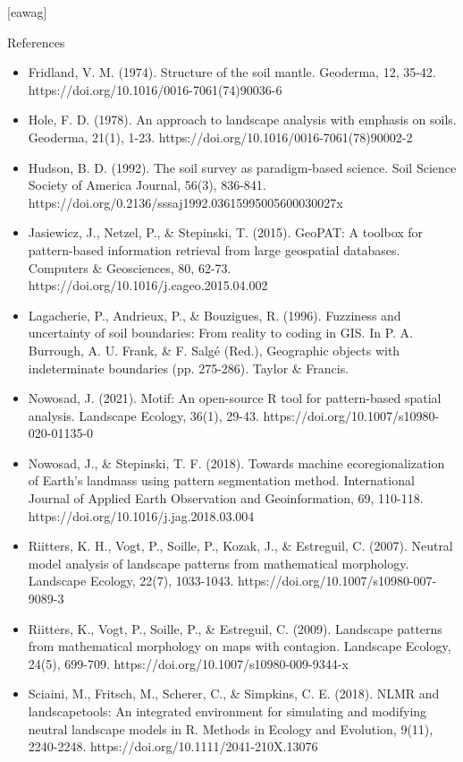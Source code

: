\documentclass[aspectratio=169]{beamer}
\begin{document}
[eawag] %

\begin{frame}[allowframebreaks]{References}
\begin{itemize}

    \item Fridland, V. M. (1974). Structure of the soil mantle. Geoderma, 12, 35-42. https://doi.org/10.1016/0016-7061(74)90036-6

    \item Hole, F. D. (1978). An approach to landscape analysis with emphasis on soils. Geoderma, 21(1), 1-23. https://doi.org/10.1016/0016-7061(78)90002-2

    \item Hudson, B. D. (1992). The soil survey as paradigm-based science. Soil Science Society of America Journal, 56(3), 836-841. https://doi.org/0.2136/sssaj1992.03615995005600030027x


    \item Jasiewicz, J., Netzel, P., \& Stepinski, T. (2015). GeoPAT: A toolbox for pattern-based information retrieval from large geospatial databases. Computers \& Geosciences, 80, 62-73. https://doi.org/10.1016/j.cageo.2015.04.002


    \item Lagacherie, P., Andrieux, P., \& Bouzigues, R. (1996). Fuzziness and uncertainty of soil boundaries: From reality to coding in GIS. In P. A. Burrough, A. U. Frank, \& F. Salgé (Red.), Geographic objects with indeterminate boundaries (pp. 275-286). Taylor \& Francis.

    \item Nowosad, J. (2021). Motif: An open-source R tool for pattern-based spatial analysis. Landscape Ecology, 36(1), 29-43. https://doi.org/10.1007/s10980-020-01135-0

    
    \item Nowosad, J., \& Stepinski, T. F. (2018). Towards machine ecoregionalization of Earth’s landmass using pattern segmentation method. International Journal of Applied Earth Observation and Geoinformation, 69, 110-118. https://doi.org/10.1016/j.jag.2018.03.004

    \item Riitters, K. H., Vogt, P., Soille, P., Kozak, J., \& Estreguil, C. (2007). Neutral model analysis of landscape patterns from mathematical morphology. Landscape Ecology, 22(7), 1033-1043. https://doi.org/10.1007/s10980-007-9089-3

    \item Riitters, K., Vogt, P., Soille, P., \& Estreguil, C. (2009). Landscape patterns from mathematical morphology on maps with contagion. Landscape Ecology, 24(5), 699-709. https://doi.org/10.1007/s10980-009-9344-x

    \item Sciaini, M., Fritsch, M., Scherer, C., \& Simpkins, C. E. (2018). NLMR and landscapetools: An integrated environment for simulating and modifying neutral landscape models in R. Methods in Ecology and Evolution, 9(11), 2240-2248. https://doi.org/10.1111/2041-210X.13076


\end{itemize}  
\end{frame}

\end{document}
